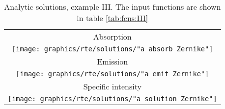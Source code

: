 \begin{table}[htdp]
\caption[Analytic solutions, example III]{Analytic solutions, example III. The input functions are shown in table \eqref{tab:fcns:III}}
\begin{center}
\begin{tabular}{c}
%
Absorption \\
\texttt{[image: graphics/rte/solutions/"a absorb Zernike"]} \\[10pt]
%
Emission \\
\texttt{[image: graphics/rte/solutions/"a emit Zernike"]} \\[10pt]
%
Specific intensity \\
\texttt{[image: graphics/rte/solutions/"a solution Zernike"]} \\
%
%
\end{tabular}
\end{center}
\label{rte:solutions III}
\end{table}%


\endinput %